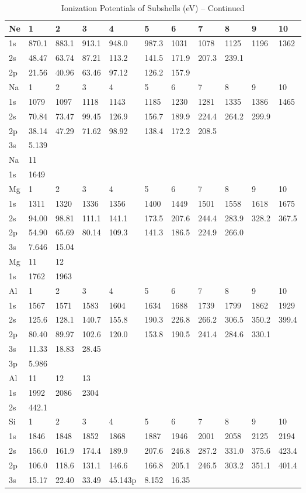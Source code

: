 \begin{table}
\begin{center}
\addtocounter{table}{-1}
\caption{Ionization Potentials of Subshells (eV) -- Continued}
\begin{tabular}{lllllllllll}
\hline
Ne&   1&   2&   3&   4&   5&   6&   7&   8&   9&  10\\
\hline
1s& 870.1& 883.1& 913.1& 948.0& 987.3&
1031&  1078&  1125&  1196&  1362\\
2s& 48.47& 63.74& 87.21& 113.2& 141.5& 171.9& 207.3&
239.1\\
2p& 21.56& 40.96& 63.46& 97.12& 126.2& 157.9\\
\hline
Na&   1&   2&   3&   4&   5&   6& 7&   8&   9&  10\\
\hline
1s&  1079&  1097&  1118&  1143&  1185&  1230&  1281&  1335&  1386&  1465\\
2s&
70.84& 73.47& 99.45& 126.9& 156.7& 189.9& 224.4& 264.2& 299.9\\
2p& 38.14& 47.29& 71.62&
98.92& 138.4& 172.2& 208.5\\
3s& 5.139\\
\hline
Na&  11\\
\hline
1s&  1649\\
\hline
Mg&   1&   2&   3&   4&   5&   6& 7&   8&   9&  10\\
\hline
1s&  1311&  1320&  1336&  1356&  1400&  1449&  1501&  1558&  1618&  1675\\
2s&
94.00& 98.81& 111.1& 141.1& 173.5& 207.6& 244.4& 283.9& 328.2& 367.5\\
2p& 54.90& 65.69&
80.14& 109.3& 141.3& 186.5& 224.9& 266.0\\
3s& 7.646& 15.04\\
\hline
Mg&  11&  12\\
\hline
1s&  1762&  1963\\
\hline
Al& 1&   2&   3&   4&   5&   6&   7&   8&   9&  10\\
\hline
1s&  1567&  1571&  1583&  1604&  1634&  1688&
1739&  1799&  1862&  1929\\
2s& 125.6& 128.1& 140.7& 155.8& 190.3& 226.8& 266.2& 306.5&
350.2& 399.4\\
2p& 80.40& 89.97& 102.6& 120.0& 153.8& 190.5& 241.4& 284.6& 330.1\\
3s& 11.33&
18.83& 28.45\\
3p& 5.986\\
\hline
Al&  11&  12&  13\\
\hline
1s&  1992&  2086&  2304\\
2s& 442.1\\
\hline
Si& 1&   2&
3&   4&   5&   6&   7&   8&   9&  10\\
\hline
1s&  1846&  1848&  1852&  1868&  1887&  1946&  2001&
2058&  2125&  2194\\
2s& 156.0& 161.9& 174.4& 189.9& 207.6& 246.8& 287.2& 331.0& 375.6&
423.4\\
2p& 106.0& 118.6& 131.1& 146.6& 166.8& 205.1& 246.5& 303.2& 351.1& 401.4\\
3s& 15.17&
22.40& 33.49& 45.143p& 8.152& 16.35\\
\hline
\end{tabular}
\end{center}
\end{table}


